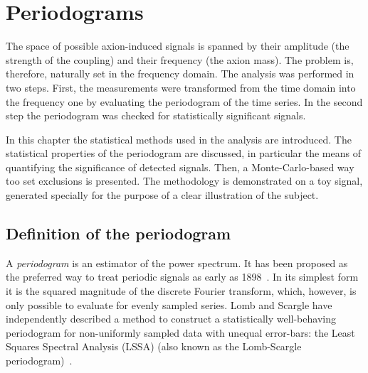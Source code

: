 \chapter{Periodograms}
\label{ch:axions-periodograms}
The space of possible axion-induced signals is spanned by their amplitude (the strength of the coupling) and their frequency (the axion mass).
The problem is, therefore, naturally set in the frequency domain.
The analysis was performed in two steps.
First, the measurements were transformed from the time domain into the frequency one by evaluating the periodogram of the time series.
In the second step the periodogram was checked for statistically significant signals.

In this chapter the statistical methods used in the analysis are introduced.
The statistical properties of the periodogram are discussed, in particular the means of quantifying the significance of detected signals.
Then, a Monte-Carlo-based way too set exclusions is presented.
The methodology is demonstrated on a toy signal, generated specially for the purpose of a clear illustration of the subject.




\section{Definition of the periodogram}
A \emph{periodogram} is an estimator of the power spectrum.
It has been proposed as the preferred way to treat periodic signals as early as 1898~\cite{Schuster1898}.
In its simplest form it is the squared magnitude of the discrete Fourier transform, which, however, is only possible to evaluate for evenly sampled series.
Lomb and Scargle have independently described a method to construct a statistically well-behaving periodogram for non-uniformly sampled data with unequal error-bars: the Least Squares Spectral Analysis (LSSA) (also known as the Lomb-Scargle periodogram)~\cite{Scargle1982}.

